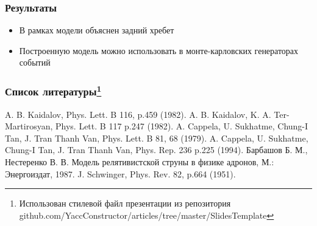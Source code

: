\documentclass{beamer}
\begin{document}
\begin{frame}[fragile]
\begin{minipage}[h]{0.48\linewidth}
\begin{figure}
\end{figure}
\end{minipage}
\end{frame}

\begin{frame}[fragile]
\frametitle{Результаты}
\begin{itemize}
\item В рамках модели объяснен задний хребет
\item Построенную модель можно использовать в монте-карловских генераторах событий
\end{itemize}
\end{frame}

\begin{frame}[fragile]
\frametitle{Список литературы\footnote{Использован стилевой файл презентации из репозитория github.com/YaccConstructor/articles/tree/master/SlidesTemplate
}}
{\small
\begin{thebibliography}{00}
A. B. Kaidalov, Phys. Lett. B 116, p.459 (1982).
A. B. Kaidalov, K. A. Ter-Martirosyan, Phys. Lett. B 117 p.247 (1982).
A. Cappela, U. Sukhatme, Chung-I Tan, J. Tran Thanh Van, Phys. Lett. B 81, 68 (1979).
A. Cappela, U. Sukhatme, Chung-I Tan, J. Tran Thanh Van, Phys. Rep. 236 p.225 (1994).
Барбашов Б. М., Нестеренко В. В. Модель релятивистской струны в физике адронов, М.: Энергоиздат, 1987.
J. Schwinger, Phys. Rev. 82, p.664 (1951).
\end{thebibliography}
}
\end{frame}
\end{document}
